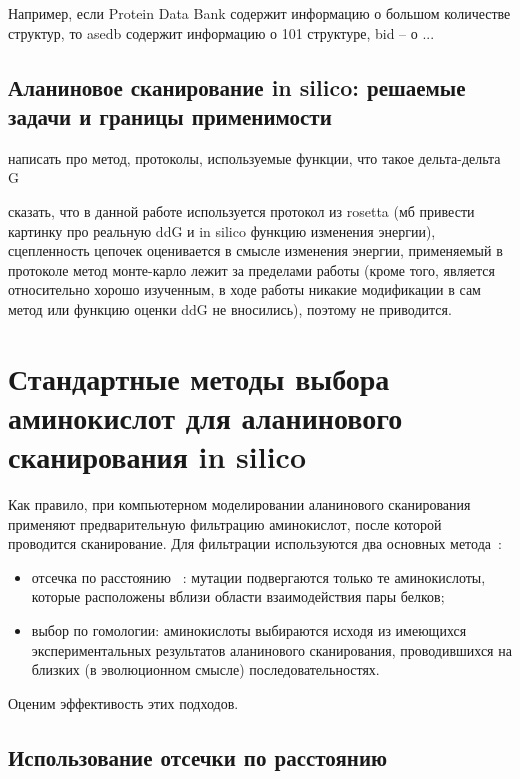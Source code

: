 Например, если Protein Data Bank содержит информацию о большом количестве структур, то asedb содержит информацию о 101 структуре, bid -- о ...%
 
\subsection{Аланиновое сканирование in silico: решаемые задачи и границы применимости}
написать про метод, протоколы, используемые функции, что такое дельта-дельта G

сказать, что в данной работе используется протокол из rosetta (мб привести картинку про реальную ddG и in silico функцию изменения энергии), сцепленность цепочек оценивается в смысле изменения энергии, применяемый в протоколе метод монте-карло лежит за пределами работы (кроме того, является относительно хорошо изученным, в ходе работы никакие модификации в сам метод или функцию оценки ddG не вносились), поэтому не приводится. 
\section{Стандартные методы выбора аминокислот для аланинового сканирования in silico}

Как правило, при компьютерном моделировании аланинового сканирования применяют предварительную фильтрацию аминокислот, после которой проводится сканирование. Для фильтрации используются два основных метода~\cite{hotspots2012rev}:
\begin{itemize}
\item отсечка по расстоянию ~\cite{kortemme2004}: мутации подвергаются только те аминокислоты, которые расположены вблизи области взаимодействия пары белков;

\item выбор по гомологии: аминокислоты выбираются исходя из имеющихся экспериментальных результатов аланинового сканирования, проводившихся на близких (в эволюционном смысле) последовательностях.
\end{itemize}

Оценим эффективость этих подходов.

\subsection{Использование отсечки по расстоянию}

